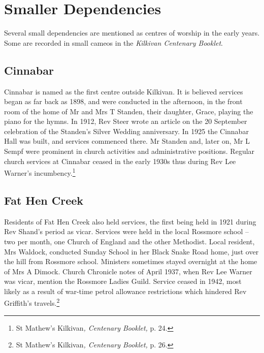 \section{Smaller Dependencies}



Several small dependencies are mentioned as centres of worship in the early years. Some are recorded in small cameos in the \emph{Kilkivan Centenary Booklet}.



\subsection{Cinnabar}



Cinnabar is named as the first centre outside Kilkivan. It is believed services began as far back as 1898, and were conducted in the afternoon, in the front room of the home of Mr and Mrs T Standen, their daughter, Grace, playing the piano for the hymns. In 1912, Rev Steer wrote an article on the 20 September celebration of the Standen's Silver Wedding anniversary. In 1925 the Cinnabar Hall was built, and services commenced there. Mr Standen and, later on, Mr L Sempf were prominent in church activities and administrative positions. Regular church services at Cinnabar ceased in the early 1930s thus during Rev Lee Warner's incumbency.\footnote{St Mathew's Kilkivan\emph{, Centenary Booklet,} p. 24.}


\subsection{Fat Hen Creek}



Residents of Fat Hen Creek also held services, the first being held in 1921 during Rev Shand's period as vicar. Services were held in the local Rossmore school -- two per month, one Church of England and the other Methodist. Local resident, Mrs Waldock, conducted Sunday School in her Black Snake Road home, just over the hill from Rossmore school. Ministers sometimes stayed overnight at the home of Mrs A Dimock. Church Chronicle notes of April 1937, when Rev Lee Warner was vicar, mention the Rossmore Ladies Guild. Service ceased in 1942, most likely as a result of war-time petrol allowance restrictions which hindered Rev Griffith's travels.\footnote{St Mathew's Kilkivan\emph{, Centenary Booklet,} p. 26.}


